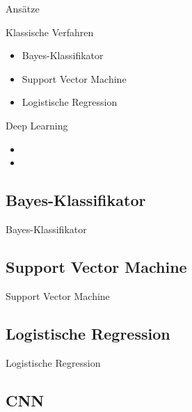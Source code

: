 \documentclass[aspectratio=169]{beamer} %
\begin{document}
\begin{frame}{Ansätze}
    \begin{block}{Klassische Verfahren}
        \begin{itemize}
            \item Bayes-Klassifikator
            \item Support Vector Machine
            \item Logistische Regression
        \end{itemize}
    \end{block}
    \begin{block}{Deep Learning}
        \begin{itemize}
            \item {}
            \item {}
        \end{itemize}
    \end{block}
\end{frame}

\subsection{Bayes-Klassifikator}

\begin{frame}{Bayes-Klassifikator}
    
\end{frame}

\subsection{Support Vector Machine}

\begin{frame}{Support Vector Machine}
    
\end{frame}

\subsection{Logistische Regression}

\begin{frame}{Logistische Regression}
    
\end{frame}

\subsection{CNN}
\end{document}
